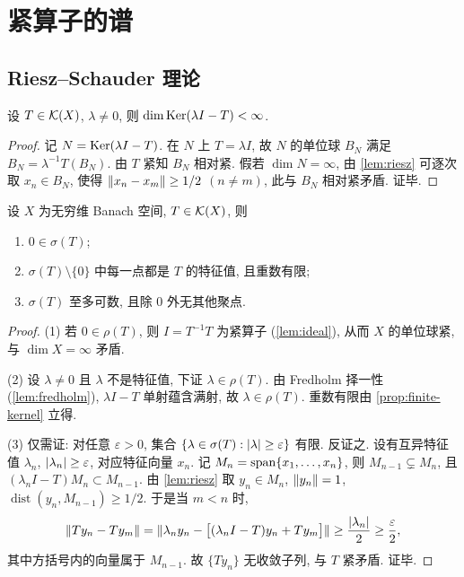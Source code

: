 \section{紧算子的谱}\label{sec:spectral}

\subsection{Riesz--Schauder 理论}

\begin{proposition}\label{prop:finite-kernel}
设 $T\in\mathcal{K}(X)$, $\lambda\neq0$, 则 $\dim\operatorname{Ker}(\lambda I-T)<\infty$.
\end{proposition}

\begin{proof}
记 $N=\operatorname{Ker}(\lambda I-T)$. 在 $N$ 上 $T=\lambda I$, 故 $N$ 的单位球 $B_N$ 满足 $B_N=\lambda^{-1}T(B_N)$. 由 $T$ 紧知 $B_N$ 相对紧. 假若 $\dim N=\infty$, 由 \cref{lem:riesz} 可逐次取 $x_n\in B_N$, 使得 $\lVert x_n-x_m\rVert\ge1/2$ $(n\neq m)$, 此与 $B_N$ 相对紧矛盾. 证毕.
\end{proof}

\begin{theorem}\label{thm:riesz-schauder}
设 $X$ 为无穷维 Banach 空间, $T\in\mathcal{K}(X)$, 则
\begin{enumerate}
  \item $0\in\sigma(T)$;
  \item $\sigma(T)\setminus\{0\}$ 中每一点都是 $T$ 的特征值, 且重数有限;
  \item $\sigma(T)$ 至多可数, 且除 $0$ 外无其他聚点.
\end{enumerate}
\end{theorem}

\begin{proof}
(1) 若 $0\in\rho(T)$, 则 $I=T^{-1}T$ 为紧算子 (\cref{lem:ideal}), 从而 $X$ 的单位球紧, 与 $\dim X=\infty$ 矛盾.

(2) 设 $\lambda\neq0$ 且 $\lambda$ 不是特征值, 下证 $\lambda\in\rho(T)$. 由 Fredholm 择一性 (\cref{lem:fredholm}), $\lambda I-T$ 单射蕴含满射, 故 $\lambda\in\rho(T)$. 重数有限由 \cref{prop:finite-kernel} 立得.

(3) 仅需证: 对任意 $\varepsilon>0$, 集合 $\{\lambda\in\sigma(T):\lvert\lambda\rvert\ge\varepsilon\}$ 有限. 反证之. 设有互异特征值 $\lambda_n$, $\lvert\lambda_n\rvert\ge\varepsilon$, 对应特征向量 $x_n$. 记 $M_n=\operatorname{span}\{x_1,\dots,x_n\}$, 则 $M_{n-1}\subsetneq M_n$, 且 $(\lambda_nI-T)M_n\subset M_{n-1}$. 由 \cref{lem:riesz} 取 $y_n\in M_n$, $\lVert y_n\rVert=1$, $\operatorname{dist}(y_n,M_{n-1})\ge1/2$. 于是当 $m<n$ 时,
\begin{equation}\label{eq:separation}
  \lVert Ty_n-Ty_m\rVert=\lVert\lambda_ny_n-\bigl[(\lambda_nI-T)y_n+Ty_m\bigr]\rVert\ge\frac{\lvert\lambda_n\rvert}{2}\ge\frac{\varepsilon}{2},
\end{equation}
其中方括号内的向量属于 $M_{n-1}$. 故 $\{Ty_n\}$ 无收敛子列, 与 $T$ 紧矛盾. 证毕.
\end{proof}

